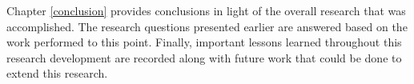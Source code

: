 
Chapter \ref{conclusion} provides conclusions in light of the overall research that was accomplished. The research questions presented earlier are answered based on the work performed to this point. Finally, important lessons learned throughout this research development are recorded along with future work that could be done to extend this research.

